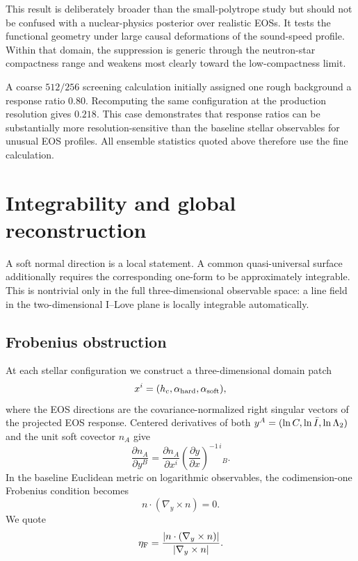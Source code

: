 This result is deliberately broader than the small-polytrope study but
should not be confused with a nuclear-physics posterior over realistic EOSs.
It tests the functional geometry under large causal deformations of the
sound-speed profile.  Within that domain, the suppression is generic through
the neutron-star compactness range and weakens most clearly toward the
low-compactness limit.

A coarse \(512/256\) screening calculation initially assigned one rough
background a response ratio \(0.80\).  Recomputing the same configuration at
the production resolution gives \(0.218\).  This case demonstrates that
response ratios can be substantially more resolution-sensitive than the
baseline stellar observables for unusual EOS profiles.  All ensemble
statistics quoted above therefore use the fine calculation.

\section{Integrability and global reconstruction}
\label{sec:global}

A soft normal direction is a local statement.  A common quasi-universal
surface additionally requires the corresponding one-form to be approximately
integrable.  This is nontrivial only in the full three-dimensional observable
space: a line field in the two-dimensional I--Love plane is locally
integrable automatically.

\subsection{Frobenius obstruction}

At each stellar configuration we construct a three-dimensional domain patch
\[
x^i=(h_c,\alpha_{\rm hard},\alpha_{\rm soft}),
\]
where the EOS directions are the covariance-normalized right singular
vectors of the projected EOS response.  Centered derivatives of both
\(y^A=(\ln C,\ln\bar I,\ln\Lambda_2)\) and the unit soft covector \(n_A\)
give
\begin{equation}
    \frac{\partial n_A}{\partial y^B}
    =
    \frac{\partial n_A}{\partial x^i}
    \left(
      \frac{\partial y}{\partial x}
    \right)^{-1\,i}{}_B .
\end{equation}
In the baseline Euclidean metric on logarithmic observables, the
codimension-one Frobenius condition becomes
\begin{equation}
    n\cdot(\nabla_y\times n)=0.
\end{equation}
We quote
\begin{equation}
    \eta_{\rm F}
    =
    \frac{|n\cdot(\nabla_y\times n)|}
         {|\nabla_y\times n|}.
    \label{eq:eta-f}
\end{equation}

